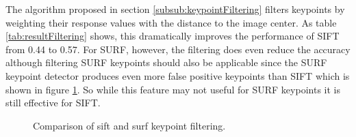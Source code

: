 	The algorithm proposed in section \ref{subsub:keypointFiltering} filters keypoints by weighting their response values with the distance to the image center. As table \ref{tab:resultFiltering} shows, this dramatically improves the performance of SIFT from 0.44 to 0.57. For SURF, however, the filtering does even reduce the accuracy although filtering SURF keypoints should also be applicable since the SURF keypoint detector produces even more false positive keypoints than SIFT which is shown in figure \ref{fig:ResultsKeypointFiltering}. So while this feature may not useful for SURF keypoints it is still effective for SIFT.  
	
	\begin{figure}[htb]
		\centering
		\hspace{\fill}%
		\hspace{\fill}%
		\hspace{\fill}%
		\hspace{\fill}%
		\hspace{\fill}%
		\caption{Comparison of \gls{sift} and \gls{surf} keypoint filtering.}
		\label{fig:ResultsKeypointFiltering}
	\end{figure}
	
